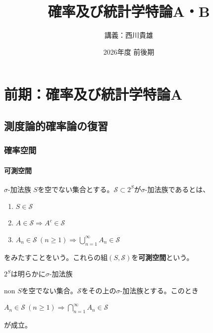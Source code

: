 \documentclass[dvipdfmx, leqno]{jsbook}
\title{確率及び統計学特論A・B}
\author{講義：西川貴雄}
\date{2026年度 前後期}
\begin{document}
\maketitle
\tableofcontents

\part{前期：確率及び統計学特論A}
\chapter{測度論的確率論の復習}
\section{確率空間}
\subsection{可測空間}
\begin{soudef}{$\sigma$-加法族} \label{soudef:sigma加法族}
    $S$を空でない集合とする。$\mathcal{S}\subset 2^S$が$\sigma$-加法族であるとは、
\begin{enumerate}
    \item\label{def_stat:Sが属する} $S\in \mathcal{S}$
    \item\label{def_stat:Aの補集合が属する} $A\in \mathcal{S}\Rightarrow A^c\in \mathcal{S}$
    \item\label{def_stat:Aの列が属するならば和集合が属する} $A_n\in \mathcal{S}\ (n\ge 1)\Rightarrow \bigcup_{n= 1}^\infty A_n\in \mathcal{S}$
\end{enumerate}
    をみたすことをいう。これらの組$(S, \mathcal{S})$を\textbf{可測空間}という。
\end{soudef}

\begin{souexample}
    $2^S$は明らかに$\sigma$-加法族
\end{souexample}

\begin{souprop}{non}
    $S$を空でない集合。$\mathcal{S}$をその上の$\sigma$-加法族とする。このとき
\begin{enumerate_roman}
    \item\label{prop_stat:「Aの列が属するならば和集合が属する」の同値条件} $A_n\in \mathcal{S}\ (n\ge 1)\Rightarrow \bigcap_{n= 1}^\infty A_n\in \mathcal{S}$
\end{enumerate_roman}
    が成立。
\end{souprop}
\end{document}
